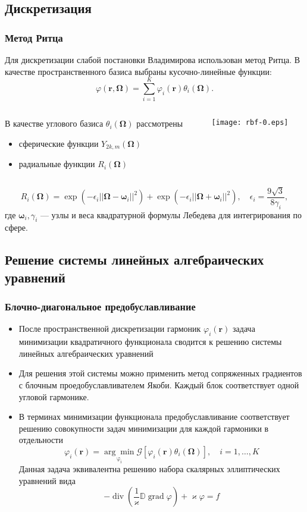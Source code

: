 \documentclass[unicode,aspectratio=43]{beamer}
\renewcommand{\vec}[1]{\boldsymbol{\mathbf{#1}}}
\renewcommand{\div}{\operatorname{div}}
\newcommand{\grad}{\operatorname{grad}}
\begin{document}
\subsection{Дискретизация}
\begin{frame}\frametitle{Метод Ритца}
	Для дискретизации слабой постановки Владимирова использован метод Ритца. В качестве пространственного базиса выбраны кусочно-линейные функции:
	\[
	\varphi(\vec r, \vec \Omega) = \sum_{i= 1}^K \varphi_i(\vec r) \theta_i(\vec \Omega).
	\]
	\begin{columns}
	\begin{column}{.8\textwidth}
	В качестве углового базиса $\theta_i(\vec \Omega)$ рассмотрены
	\begin{itemize}
	\item сферические функции $Y_{2k,m}(\vec \Omega)$
	\item радиальные функции $R_i(\vec \Omega)$
	\end{itemize}
	\end{column}
	\begin{column}{.15\textwidth}
	\raggedleft \texttt{[image: rbf-0.eps]}
	\end{column}
	\end{columns}
	\[
	R_i(\vec \Omega) = \exp\left(-\epsilon_i ||\vec \Omega - \vec \omega_i||^2\right) + \exp\left(-\epsilon_i ||\vec \Omega + \vec \omega_i||^2\right), \quad
	\epsilon_i = \frac{9\sqrt{3}}{8\gamma_i},
	\]
	где $\vec \omega_i, \gamma_i$ --- узлы и веса квадратурной формулы Лебедева для интегрирования по сфере.
\end{frame}	

\subsection{Решение системы линейных алгебраических уравнений}
\begin{frame}\frametitle{Блочно-диагональное предобуславливание}
    \begin{itemize}
    \item После пространственной дискретизации гармоник $\varphi_i(\vec r)$
    задача минимизации квадратичного функционала сводится к
    решению системы линейных алгебраических уравнений
    \item Для решения этой системы можно применить метод сопряженных градиентов с блочным проедобуславливателем Якоби.
    Каждый блок соответствует одной угловой гармонике.
    \item В терминах минимизации функционала предобуславливание
    соответствует решению совокупности задач минимизации для каждой гармоники в отдельности
    \[
        \varphi_i(\vec r) =
        \operatorname{\underset{\varphi_i}{\arg\min}} \mathcal{G}
\left[\varphi_i(\vec r) \theta_{i}(\vec \Omega) \right], \quad i = 1,\dots,K
    \]
	Данная задача эквивалентна решению набора скалярных эллиптических уравнений
вида
	\[
	-\div \left(\frac{1}{\varkappa} \mathbb D \grad \varphi\right) + \varkappa \varphi = f
	\]
    \end{itemize}
\end{frame}
\end{document}
